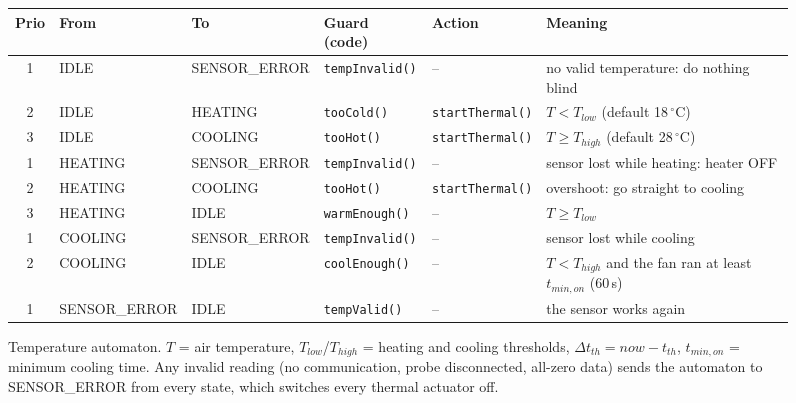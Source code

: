 \documentclass[10pt,a4paper,twocolumn]{article}
\newcommand{\code}[1]{\texttt{#1}}
\begin{document}
\begin{figure}[t]
\caption{Temperature automaton. $T$ = air temperature, $T_{low}$/$T_{high}$ = heating
and cooling thresholds, $\Delta t_{th}=\mathit{now}-t_{th}$, $t_{min,on}$ = minimum
cooling time. Any invalid reading (no communication, probe disconnected, all-zero data)
sends the automaton to SENSOR\_ERROR from every state, which switches every thermal
actuator off.}
\label{fig:temperature}
\vspace{0.9em}
\small
{}
\label{tab:temperature}
\begin{tabularx}{\textwidth}{@{}c l l l l X@{}}
\toprule
Prio & From & To & Guard (code) & Action & Meaning\\
\midrule
1 & IDLE & SENSOR\_ERROR & \code{tempInvalid()} & -- & no valid temperature: do nothing blind\\
2 & IDLE & HEATING & \code{tooCold()} & \code{startThermal()} & $T<T_{low}$ (default 18\,$^\circ$C)\\
3 & IDLE & COOLING & \code{tooHot()} & \code{startThermal()} & $T\ge T_{high}$ (default 28\,$^\circ$C)\\
1 & HEATING & SENSOR\_ERROR & \code{tempInvalid()} & -- & sensor lost while heating: heater OFF\\
2 & HEATING & COOLING & \code{tooHot()} & \code{startThermal()} & overshoot: go straight to cooling\\
3 & HEATING & IDLE & \code{warmEnough()} & -- & $T\ge T_{low}$\\
1 & COOLING & SENSOR\_ERROR & \code{tempInvalid()} & -- & sensor lost while cooling\\
2 & COOLING & IDLE & \code{coolEnough()} & -- & $T<T_{high}$ and the fan ran at least $t_{min,on}$ (60\,s)\\
1 & SENSOR\_ERROR & IDLE & \code{tempValid()} & -- & the sensor works again\\
\bottomrule
\end{tabularx}
\end{figure}
\end{document}
